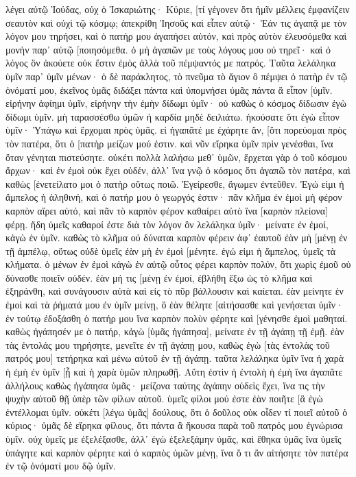 λέγει αὐτῷ Ἰούδας, οὐχ ὁ Ἰσκαριώτης· Κύριε, [τί γέγονεν ὅτι ἡμῖν μέλλεις ἐμφανίζειν σεαυτὸν καὶ οὐχὶ τῷ κόσμῳ; 
ἀπεκρίθη Ἰησοῦς καὶ εἶπεν αὐτῷ· Ἐάν τις ἀγαπᾷ με τὸν λόγον μου τηρήσει, καὶ ὁ πατήρ μου ἀγαπήσει αὐτόν, καὶ πρὸς αὐτὸν ἐλευσόμεθα καὶ μονὴν παρ᾽ αὐτῷ [ποιησόμεθα. 
ὁ μὴ ἀγαπῶν με τοὺς λόγους μου οὐ τηρεῖ· καὶ ὁ λόγος ὃν ἀκούετε οὐκ ἔστιν ἐμὸς ἀλλὰ τοῦ πέμψαντός με πατρός. 
Ταῦτα λελάληκα ὑμῖν παρ᾽ ὑμῖν μένων· 
ὁ δὲ παράκλητος, τὸ πνεῦμα τὸ ἅγιον ὃ πέμψει ὁ πατὴρ ἐν τῷ ὀνόματί μου, ἐκεῖνος ὑμᾶς διδάξει πάντα καὶ ὑπομνήσει ὑμᾶς πάντα ἃ εἶπον [ὑμῖν. 
εἰρήνην ἀφίημι ὑμῖν, εἰρήνην τὴν ἐμὴν δίδωμι ὑμῖν· οὐ καθὼς ὁ κόσμος δίδωσιν ἐγὼ δίδωμι ὑμῖν. μὴ ταρασσέσθω ὑμῶν ἡ καρδία μηδὲ δειλιάτω. 
ἠκούσατε ὅτι ἐγὼ εἶπον ὑμῖν· Ὑπάγω καὶ ἔρχομαι πρὸς ὑμᾶς. εἰ ἠγαπᾶτέ με ἐχάρητε ἄν, [ὅτι πορεύομαι πρὸς τὸν πατέρα, ὅτι ὁ [πατὴρ μείζων μού ἐστιν. 
καὶ νῦν εἴρηκα ὑμῖν πρὶν γενέσθαι, ἵνα ὅταν γένηται πιστεύσητε. 
οὐκέτι πολλὰ λαλήσω μεθ᾽ ὑμῶν, ἔρχεται γὰρ ὁ τοῦ κόσμου ἄρχων· καὶ ἐν ἐμοὶ οὐκ ἔχει οὐδέν, 
ἀλλ᾽ ἵνα γνῷ ὁ κόσμος ὅτι ἀγαπῶ τὸν πατέρα, καὶ καθὼς [ἐνετείλατο μοι ὁ πατὴρ οὕτως ποιῶ. Ἐγείρεσθε, ἄγωμεν ἐντεῦθεν. 
Ἐγώ εἰμι ἡ ἄμπελος ἡ ἀληθινή, καὶ ὁ πατήρ μου ὁ γεωργός ἐστιν· 
πᾶν κλῆμα ἐν ἐμοὶ μὴ φέρον καρπὸν αἴρει αὐτό, καὶ πᾶν τὸ καρπὸν φέρον καθαίρει αὐτὸ ἵνα [καρπὸν πλείονα] φέρῃ. 
ἤδη ὑμεῖς καθαροί ἐστε διὰ τὸν λόγον ὃν λελάληκα ὑμῖν· 
μείνατε ἐν ἐμοί, κἀγὼ ἐν ὑμῖν. καθὼς τὸ κλῆμα οὐ δύναται καρπὸν φέρειν ἀφ᾽ ἑαυτοῦ ἐὰν μὴ [μένῃ ἐν τῇ ἀμπέλῳ, οὕτως οὐδὲ ὑμεῖς ἐὰν μὴ ἐν ἐμοὶ [μένητε. 
ἐγώ εἰμι ἡ ἄμπελος, ὑμεῖς τὰ κλήματα. ὁ μένων ἐν ἐμοὶ κἀγὼ ἐν αὐτῷ οὗτος φέρει καρπὸν πολύν, ὅτι χωρὶς ἐμοῦ οὐ δύνασθε ποιεῖν οὐδέν. 
ἐὰν μή τις [μένῃ ἐν ἐμοί, ἐβλήθη ἔξω ὡς τὸ κλῆμα καὶ ἐξηράνθη, καὶ συνάγουσιν αὐτὰ καὶ εἰς τὸ πῦρ βάλλουσιν καὶ καίεται. 
ἐὰν μείνητε ἐν ἐμοὶ καὶ τὰ ῥήματά μου ἐν ὑμῖν μείνῃ, ὃ ἐὰν θέλητε [αἰτήσασθε καὶ γενήσεται ὑμῖν· 
ἐν τούτῳ ἐδοξάσθη ὁ πατήρ μου ἵνα καρπὸν πολὺν φέρητε καὶ [γένησθε ἐμοὶ μαθηταί. 
καθὼς ἠγάπησέν με ὁ πατήρ, κἀγὼ [ὑμᾶς ἠγάπησα], μείνατε ἐν τῇ ἀγάπῃ τῇ ἐμῇ. 
ἐὰν τὰς ἐντολάς μου τηρήσητε, μενεῖτε ἐν τῇ ἀγάπῃ μου, καθὼς ἐγὼ [τὰς ἐντολὰς τοῦ πατρός μου] τετήρηκα καὶ μένω αὐτοῦ ἐν τῇ ἀγάπῃ. 
ταῦτα λελάληκα ὑμῖν ἵνα ἡ χαρὰ ἡ ἐμὴ ἐν ὑμῖν [ᾖ καὶ ἡ χαρὰ ὑμῶν πληρωθῇ. 
Αὕτη ἐστὶν ἡ ἐντολὴ ἡ ἐμὴ ἵνα ἀγαπᾶτε ἀλλήλους καθὼς ἠγάπησα ὑμᾶς· 
μείζονα ταύτης ἀγάπην οὐδεὶς ἔχει, ἵνα τις τὴν ψυχὴν αὐτοῦ θῇ ὑπὲρ τῶν φίλων αὐτοῦ. 
ὑμεῖς φίλοι μού ἐστε ἐὰν ποιῆτε [ἃ ἐγὼ ἐντέλλομαι ὑμῖν. 
οὐκέτι [λέγω ὑμᾶς] δούλους, ὅτι ὁ δοῦλος οὐκ οἶδεν τί ποιεῖ αὐτοῦ ὁ κύριος· ὑμᾶς δὲ εἴρηκα φίλους, ὅτι πάντα ἃ ἤκουσα παρὰ τοῦ πατρός μου ἐγνώρισα ὑμῖν. 
οὐχ ὑμεῖς με ἐξελέξασθε, ἀλλ᾽ ἐγὼ ἐξελεξάμην ὑμᾶς, καὶ ἔθηκα ὑμᾶς ἵνα ὑμεῖς ὑπάγητε καὶ καρπὸν φέρητε καὶ ὁ καρπὸς ὑμῶν μένῃ, ἵνα ὅ τι ἂν αἰτήσητε τὸν πατέρα ἐν τῷ ὀνόματί μου δῷ ὑμῖν. 
